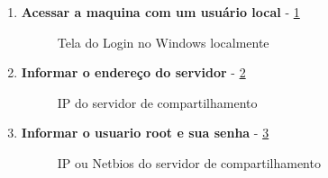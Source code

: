 \begin{enumerate}
	\item \textbf{Acessar a maquina com um usuário local} - \ref{login_windows_local}
		\begin{figure}[ht]
		   	\centering
		   	\caption{Tela do Login no Windows localmente}
		    \label{login_windows_local}
		\end{figure}
		
	\item \textbf{Informar o endereço do servidor} - \ref{server_ip}	
	\begin{figure}[ht]
	   	\centering
	   	\caption{IP do servidor de compartilhamento}
	    \label{server_ip}
	\end{figure}
		
	\item \textbf{Informar o usuario root e sua senha} - \ref{root_password}	
	\begin{figure}[ht]
	   	\centering
	   	\caption{IP ou Netbios do servidor de compartilhamento}
	    \label{root_password}
	\end{figure}
	

\end{enumerate}

